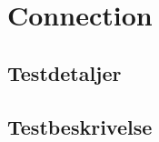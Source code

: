 \section{Connection}\label{sec:testconnection}

\subsection{Testdetaljer}



\subsection{Testbeskrivelse}
